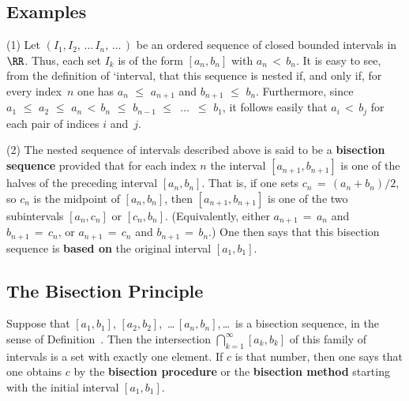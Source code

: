 \VV

            \subsection{\small{\bf Examples}}
            \label{ExampB30.05AA}
\V

\hspace*{\parindent}(1) Let $(I_{1}, I_{2},\,{\ldots}\,I_{n},\,{\ldots}\,)$
    be an ordered sequence of closed bounded intervals in~${\RR}$.
    Thus, each set $I_{k}$ is of the form $[a_{n},b_{n}]$ with $a_{n}\,<\,b_{n}$.
    It is easy to see, from the definition of `interval, that this sequence is nested if, and only if,
    for every index~$n$ one has $a_{n}\,\,{\leq}\,\,a_{n+1}$ and $b_{n+1}\,\,{\leq}\,\,b_{n}$. Furthermore, since $a_{1}\,\,{\leq}\,\,a_{2}\,\,{\leq}\,\,a_{n}\,<\,b_{n}\,\,{\leq}\,\,b_{n-1}\,\,{\leq}\,\,\,{\ldots}\,\,\,{\leq}\,\,b_{1}$,
    it follows easily that $a_{i}\,<\,b_{j}$ for each pair of indices $i$ and~$j$.

\V

        (2) The nested sequence of intervals described above is said to be a {\bf bisection sequence} provided that
    for each index $n$ the interval $[a_{n+1},b_{n+1}]$ is one of the halves of the preceding interval $[a_{n},b_{n}]$.
    That is, if one sets $c_{n} \,=\, (a_{n}+b_{n})/2$, so $c_{n}$ is the midpoint of $[a_{n},b_{n}]$,
    then $[a_{n+1},b_{n+1}]$ is one of the two subintervals $[a_{n},c_{n}]$ or $[c_{n},b_{n}]$.
    (Equivalently, either $a_{n+1} \,=\, a_{n}$ and $b_{n+1} \,=\, c_{n}$, or $a_{n+1} \,=\, c_{n}$ and $b_{n+1} \,=\, b_{n}$.)
    One then says that this bisection sequence is {\bf based on} the original interval $[a_{1},b_{1}]$.

\V

            \subsection{\small{\bf The Bisection Principle}}
            \label{DefB30.05B}
\V

        Suppose that $[a_{1},b_{1}]$, $[a_{2},b_{2}]$, \,{\ldots}\,$[a_{n},b_{n}]$,\,{\ldots}\, is a bisection sequence,
    in the sense of Definition~.
    Then the intersection ${\bigcap}_{k=1}^{{\infty}} [a_{k},b_{k}]$ of this family of intervals is a set with exactly one element.
    If $c$ is that number, then one says that one obtains $c$ by the {\bf bisection procedure} or the {\bf bisection method} starting with the initial interval $[a_{1},b_{1}]$.

